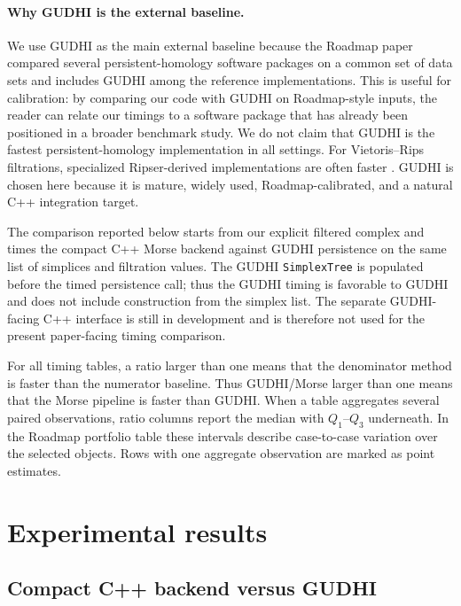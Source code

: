\paragraph{Why GUDHI is the external baseline.}
We use GUDHI as the main external baseline because the Roadmap paper
\cite{OtterPorterTillmannGrindrodHarrington2017} compared several persistent-homology
software packages on a common set of data sets and includes GUDHI among the reference
implementations.  This is useful for calibration: by comparing our code with GUDHI on
Roadmap-style inputs, the reader can relate our timings to a software package that has
already been positioned in a broader benchmark study.  We do not claim that GUDHI is the
fastest persistent-homology implementation in all settings.  For Vietoris--Rips
filtrations, specialized Ripser-derived implementations are often faster
\cite{BauerRipser2021,ZhangXiaoWangRipserPlusPlus2020,BurellaPerezHaukeLupoCaorsiDassattiGiottoPH2021}.
GUDHI is chosen here because it is mature, widely used, Roadmap-calibrated, and a natural
C++ integration target.

The comparison reported below starts from our explicit filtered complex and times the
compact C++ Morse backend against GUDHI persistence on the same list of simplices and
filtration values.  The GUDHI \texttt{SimplexTree} is populated before the timed
persistence call; thus the GUDHI timing is favorable to GUDHI and does not include
construction from the simplex list.  The separate GUDHI-facing C++ interface is still in
development and is therefore not used for the present paper-facing timing comparison.

For all timing tables, a ratio larger than one means that the denominator method is faster
than the numerator baseline.  Thus GUDHI/Morse larger than one means that the Morse
pipeline is faster than GUDHI.
When a table aggregates several paired observations, ratio columns report the median with
\(Q_1\)--\(Q_3\) underneath.  In the Roadmap portfolio table these intervals describe
case-to-case variation over the selected objects.  Rows with one aggregate observation are
marked as point estimates.

\section{Experimental results}
\label{sec:experimental-results}

\subsection{Compact C++ backend versus GUDHI}


